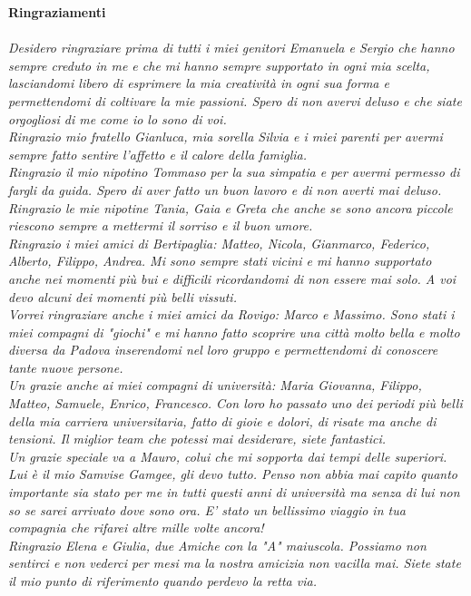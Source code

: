 \thispagestyle{empty}
\textbf{Ringraziamenti}\\\\
\textit{
Desidero ringraziare prima di tutti i miei genitori Emanuela e Sergio che hanno sempre creduto in me e che mi hanno sempre supportato in ogni mia scelta, lasciandomi libero di esprimere la mia creativit\`a in ogni sua forma e permettendomi di coltivare la mie passioni. Spero di non avervi deluso e che siate orgogliosi di me come io lo sono di voi.
\\
Ringrazio mio fratello Gianluca, mia sorella Silvia e i miei parenti per avermi sempre fatto sentire l'affetto e il calore della famiglia.
\\
Ringrazio il mio nipotino Tommaso per la sua simpatia e per avermi permesso di fargli da guida. Spero di aver fatto un buon lavoro e di non averti mai deluso. Ringrazio le mie nipotine Tania, Gaia e Greta che anche se sono ancora piccole riescono sempre a mettermi il sorriso e il buon umore.
\\
Ringrazio i miei amici di Bertipaglia: Matteo, Nicola, Gianmarco, Federico, Alberto, Filippo, Andrea. Mi sono sempre stati vicini e mi hanno supportato anche nei momenti pi\`u bui e difficili ricordandomi di non essere mai solo. A voi devo alcuni dei momenti pi\`u belli vissuti.
\\
Vorrei ringraziare anche i miei amici da Rovigo: Marco e Massimo. Sono stati i miei compagni di "giochi" e mi hanno fatto scoprire una citt\`a molto bella e molto diversa da Padova inserendomi nel loro gruppo e permettendomi di conoscere tante nuove persone.
\\
Un grazie anche ai miei compagni di universit\`a: Maria Giovanna, Filippo, Matteo, Samuele, Enrico, Francesco. Con loro ho passato uno dei periodi pi\`u belli della mia carriera universitaria, fatto di gioie e dolori, di risate ma anche di tensioni. Il miglior team che potessi mai desiderare, siete fantastici.
\\
Un grazie speciale va a Mauro, colui che mi sopporta dai tempi delle superiori. Lui \`e il mio Samvise Gamgee, gli devo tutto. Penso non abbia mai capito quanto importante sia stato per me in tutti questi anni di universit\`a ma senza di lui non so se sarei arrivato dove sono ora. E' stato un bellissimo viaggio in tua compagnia che rifarei altre mille volte ancora!
\\
Ringrazio Elena e Giulia, due Amiche con la "A" maiuscola. Possiamo non sentirci e non vederci per mesi ma la nostra amicizia non vacilla mai. Siete state il mio punto di riferimento quando perdevo la retta via.
}
